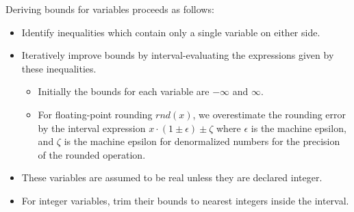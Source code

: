 \documentclass[runningheads]{llncs}
\begin{document}
Deriving bounds for variables proceeds as follows:
\begin{itemize}
  \item Identify inequalities which contain only a single variable on either side.
  \item Iteratively improve bounds by interval-evaluating the expressions given by these inequalities.
  \begin{itemize}
    \item Initially the bounds for each variable are $-\infty$ and $\infty$.
    \item For floating-point rounding $\mathit{rnd}(x)$, we overestimate the rounding error by the interval expression $x\cdot(1\pm\epsilon) \pm \zeta$ where $\epsilon$ is the machine epsilon, and $\zeta$ is the machine epsilon for denormalized numbers for the precision of the rounded operation.
  \end{itemize}
  \item These variables are assumed to be real unless they are declared integer. 
  \item For integer variables, 
  trim their bounds to nearest integers inside the interval.
\end{itemize} 
\end{document}

